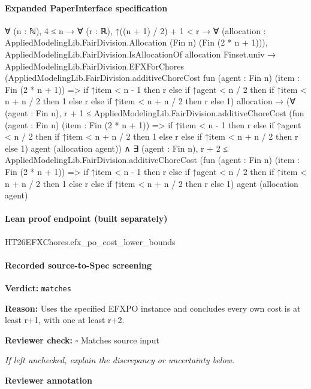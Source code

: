 \documentclass[10pt]{article}
\newcommand{\reviewerbox}{%
  \par\noindent\fbox{\parbox{0.96\linewidth}{\rule{0pt}{0.38in}}}\par
}
\newcommand{\reviewmatch}[1]{%
  \par\noindent\textbf{Reviewer check:} $\square$\; #1\par
  \noindent\emph{If left unchecked, explain the discrepancy or uncertainty below.}\par
}
\begin{document}
\paragraph{Expanded PaperInterface specification}
\begin{ReviewVerbatim}
∀ (n : ℕ),
  4 ≤ n →
    ∀ (r : ℝ),
      ↑((n + 1) / 2) + 1 < r →
        ∀ (allocation : AppliedModelingLib.FairDivision.Allocation (Fin n) (Fin (2 * n + 1))),
          AppliedModelingLib.FairDivision.IsAllocationOf allocation Finset.univ →
            AppliedModelingLib.FairDivision.EFXForChores
                (AppliedModelingLib.FairDivision.additiveChoreCost fun (agent : Fin n) (item : Fin (2 * n + 1)) =>
                  if ↑item < n - 1 then r
                  else
                    if ↑agent < n / 2 then if ↑item < n + n / 2 then 1 else r else if ↑item < n + n / 2 then r else 1)
                allocation →
              (∀ (agent : Fin n),
                  r + 1 ≤
                    AppliedModelingLib.FairDivision.additiveChoreCost
                      (fun (agent : Fin n) (item : Fin (2 * n + 1)) =>
                        if ↑item < n - 1 then r
                        else
                          if ↑agent < n / 2 then if ↑item < n + n / 2 then 1 else r
                          else if ↑item < n + n / 2 then r else 1)
                      agent (allocation agent)) ∧
                ∃ (agent : Fin n),
                  r + 2 ≤
                    AppliedModelingLib.FairDivision.additiveChoreCost
                      (fun (agent : Fin n) (item : Fin (2 * n + 1)) =>
                        if ↑item < n - 1 then r
                        else
                          if ↑agent < n / 2 then if ↑item < n + n / 2 then 1 else r
                          else if ↑item < n + n / 2 then r else 1)
                      agent (allocation agent)
\end{ReviewVerbatim}



\paragraph{Lean proof endpoint (built separately)}\begin{ReviewVerbatim}
HT26EFXChores.efx_po_cost_lower_bounds
\end{ReviewVerbatim}

\paragraph{Recorded source-to-Spec screening}
\textbf{Verdict:} \texttt{matches}
\\
{\raggedright
\textbf{Reason:} Uses the specified EFXPO instance and concludes every own cost is at least r+1, with one at least r+2.\allowbreak{}
\par}
\reviewmatch{Matches source input}
\noindent\textbf{Reviewer annotation}\par
\reviewerbox
\clearpage
\hypertarget{source-claim-03ed4c5388a9d78f}{}
\end{document}
